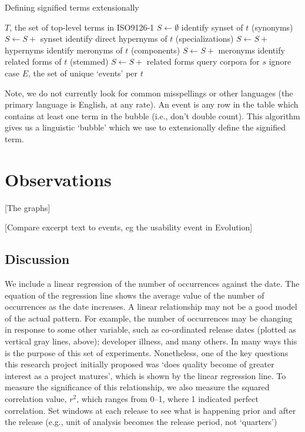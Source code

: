 \documentclass[conference, compsoc]{IEEEtran}
\begin{document}
\renewcommand{\algorithmiccomment}[1]{// #1}
\begin{algorithm}[H]
\caption{Defining signified terms extensionally}
  \label{alg1}
\begin{algorithmic}
	\REQUIRE $T$, the set of top-level terms in ISO9126-1
	\STATE $S \leftarrow \emptyset $
	\STATE identify synset of $t$ (synonyms)%
	\STATE $S \leftarrow S +$ synset
	\STATE identify direct hypernyms of $t$ (specializations)%
	\STATE $S \leftarrow S +$ hypernyms %
	\STATE identify meronyms of $t$ (components)%
	\STATE $S \leftarrow S +$ meronyms %
	\STATE identify related forms of $t$ (stemmed)%
	\STATE $S \leftarrow S +$ related forms
		\STATE query corpora for $s$
		\COMMENT ignore case
	\ENDFOR
  \ENDFOR
\RETURN $E$, the set of unique `events' per $t$

\end{algorithmic}
\end{algorithm}
Note, we do not currently look for common misspellings or other languages (the primary language is English, at any rate). An event is any row in the table which contains at least one term in the bubble (i.e., don't double count). This algorithm gives us a linguistic `bubble' which we use to extensionally define the signified term.

\section{Observations}
\label{sec:observations}
[The graphs]

[Compare excerpt text to events, eg the usability event in Evolution]
\subsection{Discussion}
We include a linear regression of the number of occurrences against the date. The equation of the regression line shows the average value of the number of occurrences as the date increases. A linear relationship may not be a good model of the actual pattern. For example, the number of occurrences may be changing in response to some other variable, such as co-ordinated release dates (plotted as vertical gray lines, above); developer illness, and many others. In many ways this is the purpose of this set of experiments. Nonetheless, one of the key questions this research project initially proposed was `does quality become of greater interest as a project matures', which is shown by the linear regression line. To measure the significance of this relationship, we also measure the squared correlation value, $r^2$, which ranges from 0--1, where 1 indicated perfect correlation.
Set windows at each release to see what is happening prior and after the release (e.g., unit of analysis becomes the release period, not `quarters')
\end{document}
